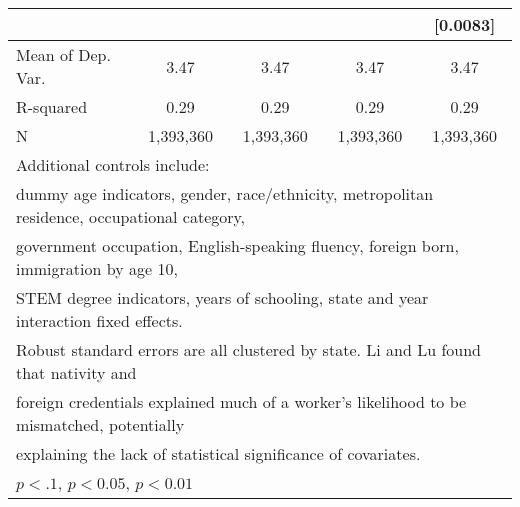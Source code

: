 \begin{table}[htbp]
\begin{tabular}{l*{4}{c}}
                    &                     &                     &                     &    [0.0083]         \\
\midrule
Mean of Dep. Var.   &        3.47         &        3.47         &        3.47         &        3.47         \\
R-squared           &        0.29         &        0.29         &        0.29         &        0.29         \\
N                   &   1,393,360         &   1,393,360         &   1,393,360         &   1,393,360         \\
\bottomrule
\multicolumn{5}{l}{\footnotesize Additional controls include:}\\
\multicolumn{5}{l}{\footnotesize dummy age indicators, gender, race/ethnicity, metropolitan residence, occupational category,}\\
\multicolumn{5}{l}{\footnotesize government occupation, English-speaking fluency, foreign born, immigration by age 10,}\\
\multicolumn{5}{l}{\footnotesize STEM degree indicators, years of schooling, state and year interaction fixed effects.}\\
\multicolumn{5}{l}{\footnotesize Robust standard errors are all clustered by state. Li and Lu found that nativity and}\\
\multicolumn{5}{l}{\footnotesize foreign credentials explained much of a worker's likelihood to be mismatched, potentially}\\
\multicolumn{5}{l}{\footnotesize explaining the lack of statistical significance of covariates.}\\
\multicolumn{5}{l}{\footnotesize \sym{*} \(p<.1\), \sym{**} \(p<0.05\), \sym{***} \(p<0.01\)}\\
\end{tabular}
\end{table}
